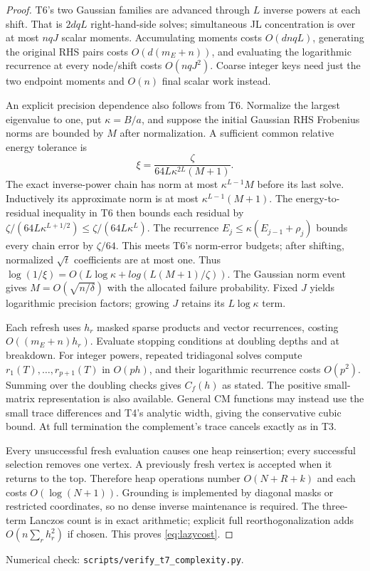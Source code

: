 \documentclass[11pt]{article}
\begin{document}
\begin{proof}
T6's two Gaussian families are advanced through $L$ inverse powers
at each shift. That is $2dqL$ right-hand-side solves; simultaneous
JL concentration is over at most $nqJ$ scalar moments. Accumulating
moments costs $O(dnqL)$, generating the original RHS pairs costs
$O(d(m_E+n))$, and evaluating the logarithmic recurrence at every
node/shift costs $O(nqJ^2)$. Coarse integer keys need just the two
endpoint moments and $O(n)$ final scalar work instead.

An explicit precision dependence also follows from T6. Normalize
the largest eigenvalue to one, put $\kappa=B/a$, and suppose the
initial Gaussian RHS Frobenius norms are bounded by $M$ after
normalization. A sufficient common relative energy tolerance is
\[
 \xi=\frac{\zeta}{64L\kappa^{2L}(M+1)}.
\]
The exact inverse-power chain has norm at most $\kappa^{L-1}M$
before its last solve. Inductively its approximate norm is at most
$\kappa^{L-1}(M+1)$. The energy-to-residual inequality in T6
then bounds each residual by
$\zeta/(64L\kappa^{L+1/2})\leq\zeta/(64L\kappa^L)$.
The recurrence $E_j\leq\kappa(E_{j-1}+\rho_j)$ bounds every
chain error by $\zeta/64$. This meets T6's norm-error budgets;
after shifting, normalized $\sqrt t$ coefficients are at most one.
Thus $\log(1/\xi)=O(L\log\kappa+log(L(M+1)/\zeta))$.
The Gaussian norm event gives $M=O(\sqrt{n/\delta})$ with the
allocated failure probability. Fixed $J$ yields logarithmic
precision factors; growing $J$ retains its $L\log\kappa$ term.

Each refresh uses $h_r$ masked sparse products and vector
recurrences, costing $O((m_E+n)h_r)$. Evaluate stopping conditions
at doubling depths and at breakdown. For integer powers, repeated
tridiagonal solves compute $r_1(T),\ldots,r_{p+1}(T)$ in $O(ph)$,
and their logarithmic recurrence costs $O(p^2)$. Summing over the
doubling checks gives $C_f(h)$ as stated. The positive small-matrix
representation is also available. General CM functions may instead
use the small trace differences and T4's analytic width, giving
the conservative cubic bound. At full termination the complement's
trace cancels exactly as in T3.

Every unsuccessful fresh evaluation causes one heap reinsertion;
every successful selection removes one vertex. A previously fresh
vertex is accepted when it returns to the top. Therefore heap
operations number $O(N+R+k)$ and each costs $O(\log(N+1))$.
Grounding is implemented by diagonal masks or restricted coordinates,
so no dense inverse maintenance is required. The three-term Lanczos
count is in exact arithmetic; explicit full reorthogonalization
adds $O(n\sum_r h_r^2)$ if chosen. This proves \eqref{eq:lazycost}.
\end{proof}
\noindent Numerical check: \texttt{scripts/verify\_t7\_complexity.py}.
\end{document}
